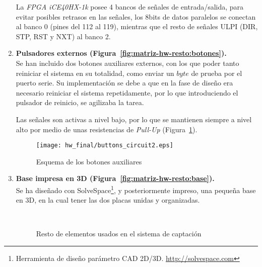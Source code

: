 \begin{enumerate}
    La \emph{FPGA iCE40HX-1k} posee 4 bancos de señales de entrada/salida, para evitar posibles retrasos en las señales\cite{fpga:routing}, los 8bits de datos paralelos se conectan al banco 0 (pines del 112 al 119), mientras que el resto de señales ULPI (DIR, STP, RST y NXT) al banco 2.
    
    \item \textbf{Pulsadores externos (Figura~\ref{fig:matriz-hw-resto:botones}).} \\
    Se han incluido dos botones auxiliares externos, con los que poder tanto reiniciar el sistema en su totalidad, como enviar un $byte$ de prueba por el puerto serie. Su implementación se debe a que en la fase de diseño era necesario reiniciar el sistema repetidamente, por lo que introduciendo el pulsador de reinicio, se agilizaba la tarea.
    
    Las señales son activas a nivel bajo, por lo que se mantienen siempre a nivel alto por medio de unas resistencias de \emph{Pull-Up} (Figura~\ref{fig:buttons_circuit}).
    \begin{figure}[h]
        \centering
        \texttt{[image: hw\_final/buttons\_circuit2.eps]}
        \caption{Esquema de los botones auxiliares}
        \label{fig:buttons_circuit}
    \end{figure}

    \item \textbf{Base impresa en 3D (Figura~\ref{fig:matriz-hw-resto:base}).} \\
    Se ha diseñado con SolveSpace\footnote{Herramienta de diseño parámetro CAD 2D/3D. \url{http://solvespace.com}}, y posteriormente impreso, una pequeña base en 3D, en la cual tener las dos placas unidas y organizadas.

    \begin{figure}[!htb]
        \centering
         \\
        \caption{Resto de elementos usados en el sistema de captación} 
        \label{fig:matriz-hw-resto}
    \end{figure}
\end{enumerate}

